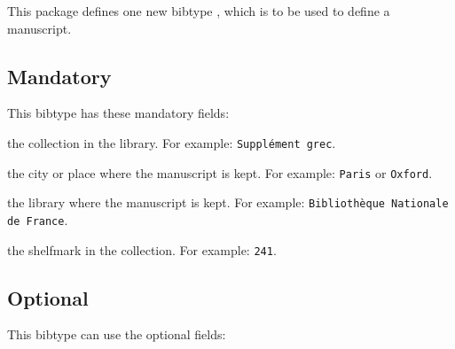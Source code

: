 \documentclass{ltxdockit}[2011/03/25]
\begin{document}
This package defines one new bibtype , which is to be used to define a manuscript.

\subsection{Mandatory}
This bibtype has these mandatory fields:

\begin{fieldlist}

 the collection in the library. For example: \verb+Supplément grec+.

 the city or place where the manuscript is kept. For example: \verb+Paris+ or \verb+Oxford+.

 the library where the manuscript is kept. For example: \verb+Bibliothèque Nationale de France+.


 the shelfmark in the collection. For example: \verb+241+.
\end{fieldlist}

\subsection{Optional}
This bibtype can use the optional fields:
\end{document}

